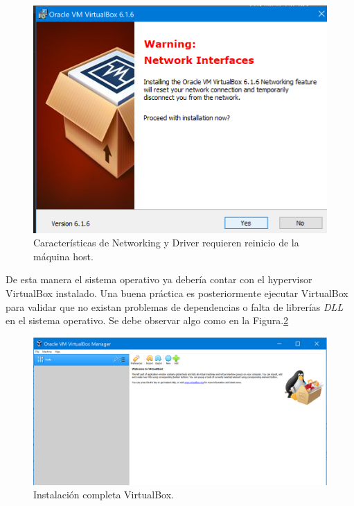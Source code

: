 \documentclass[letterpaper, 12pt, oneside]{article}
\begin{document}
\begin{center}
        \begin{figure}[H]
            \includegraphics[scale=1]{img/install/virtualbox6.png}
            \caption{Características de Networking  y Driver requieren reinicio de la máquina host.}
            \label{fig:vbox6}
        \end{figure}
     \end{center}  
    De esta manera el sistema operativo ya debería contar con el hypervisor VirtualBox instalado. Una buena práctica es posteriormente ejecutar VirtualBox para validar que no existan problemas de dependencias o falta de librerías \textit{DLL} en el sistema operativo. Se debe observar algo como en la Figura.\ref{fig:vbox7}
    \begin{center}
    \begin{figure}[H]
        \includegraphics[scale=0.7]{img/install/virtualbox7.png}
        \caption{Instalación completa VirtualBox.}
        \label{fig:vbox7}
    \end{figure}
    \end{center}
    
\end{document}
